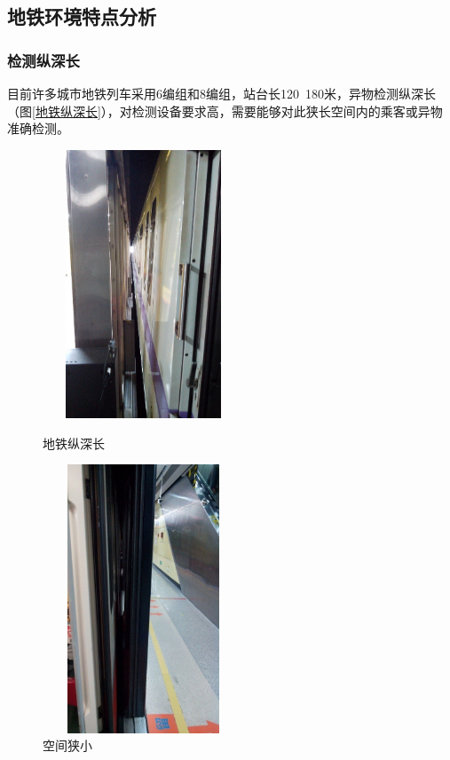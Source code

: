 \subsection{地铁环境特点分析}
\subsubsection*{检测纵深长}
目前许多城市地铁列车采用6编组和8编组，站台长120~180米，异物检测纵深长（图\ref{地铁纵深长}），对检测设备要求高，需要能够对此狭长空间内的乘客或异物准确检测。
\begin{figure}[htbp]
	\centering
	\begin{minipage}[c]{0.5\textwidth} %
		\centering
		\includegraphics[width=6cm,height=8cm]{Fig/地铁纵深长.jpg}
		\caption{\label{地铁纵深长}地铁纵深长}
	\end{minipage}%
	\begin{minipage}[c]{0.5\textwidth}
		\centering
		\includegraphics[width=6cm,height=8cm]{Fig/空间狭小.jpg}
		\caption{\label{空间狭小}空间狭小}
	\end{minipage}
\end{figure}
